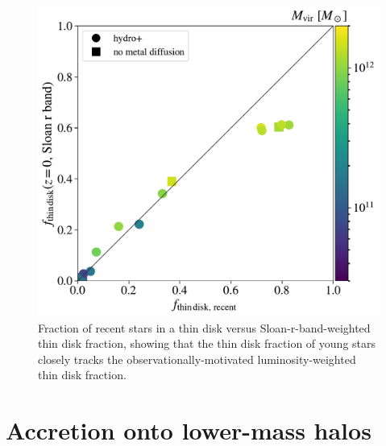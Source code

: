 \documentclass[fleqn,usenatbib]{mnras}
\begin{document}
\begin{figure}
    \centering
    \includegraphics[width=\columnwidth]{figures/prevalence/thin_disk_v_thin_disk.pdf}
    \caption{
    Fraction of recent stars in a thin disk versus Sloan-r-band-weighted thin disk fraction, showing that the thin disk fraction of young stars closely tracks the observationally-motivated luminosity-weighted thin disk fraction.
    }
    \label{f: thin disk v thin disk}
\end{figure}

\section{Accretion onto lower-mass halos}
\label{s: appendix-low mass}
\end{document}
